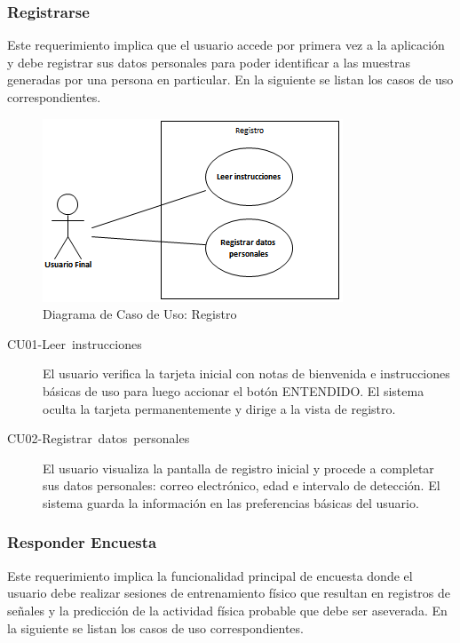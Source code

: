 \subsubsection{Registrarse}

Este requerimiento implica que el usuario accede por primera vez a
la aplicación y debe registrar sus datos personales para poder identificar
a las muestras generadas por una persona en particular. En la siguiente
 se listan los casos de uso correspondientes.

\begin{figure}[H]
\begin{centering}
\includegraphics{capitulo-5/graphics/caso_registro}
\par\end{centering}
\caption[Diagrama de Caso de Uso: Registro]{\label{fig5:uc-registro}Diagrama de Caso de Uso: Registro}
\end{figure}

\begin{description}
\item [{CU01-Leer~instrucciones}] El usuario verifica la tarjeta inicial
con notas de bienvenida e instrucciones básicas de uso para luego
accionar el botón \flqq{}ENTENDIDO\frqq{}. El sistema oculta la
tarjeta permanentemente y dirige a la vista de registro.
\item [{CU02-Registrar~datos~personales}] El usuario visualiza la pantalla
de registro inicial y procede a completar sus datos personales: correo
electrónico, edad e intervalo de detección. El sistema guarda la información
en las preferencias básicas del usuario.
\end{description}

\subsubsection{Responder Encuesta}

Este requerimiento implica la funcionalidad principal de encuesta
donde el usuario debe realizar sesiones de entrenamiento físico que
resultan en registros de señales y la predicción de la actividad física
probable que debe ser aseverada. En la siguiente 
se listan los casos de uso correspondientes.

